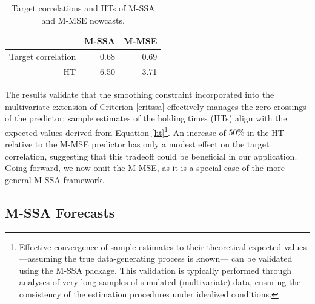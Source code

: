 \documentclass[a4paper]{article}
\begin{document}
\begin{table}[ht]
\centering
\begin{tabular}{rrr}
  \hline
 & M-SSA & M-MSE \\ 
  \hline
Target correlation & 0.68 & 0.69 \\ 
  HT & 6.50 & 3.71 \\ 
   \hline
\end{tabular}
\caption{Target correlations and HTs of M-SSA and M-MSE nowcasts.  } 
\label{corhtnow}
\end{table}The results validate that the smoothing constraint incorporated into the multivariate extension of Criterion \eqref{critssa} effectively manages the zero-crossings of the predictor: sample estimates of the holding times (HTs) align with the expected values derived from Equation \eqref{ht}\footnote{Effective convergence of sample estimates to their theoretical expected values —assuming the true data-generating process is known— can be validated using the M-SSA package. This validation is typically performed through analyses of very long samples of simulated (multivariate) data, ensuring the consistency of the estimation procedures under idealized conditions.}. An increase of $50\%$ in the HT relative to the M-MSE predictor has only a modest effect on the target correlation, suggesting that this tradeoff could be beneficial in our application. Going forward, we now omit the M-MSE, as it is a special case of the more general M-SSA framework.


\subsection{M-SSA Forecasts}
\end{document}
